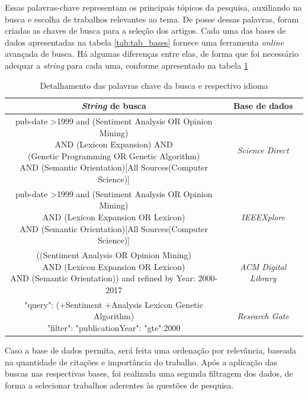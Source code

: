 \documentclass[12pt]{article}
\begin{document}
Essas palavras-chave representam os principais tópicos da pesquisa, auxiliando na busca e escolha de trabalhos relevantes ao tema. De posse dessas palavras, foram criadas as chaves de busca para a seleção dos artigos. Cada uma das bases de dados apresentadas na tabela \ref{tab:tab_bases} fornece uma ferramenta \emph{online} avançada de busca. Há algumas diferenças entre elas, de forma que foi necessário adequar a \emph{string} para cada uma, conforme apresentado na tabela \ref{tab:tab_palchaves}


\begin{table}[h]
\centering
\begin{tabular}{| c | c |}
\hline
\textbf{\emph{String} de busca} & \textbf{Base de dados} \\
\hline
\makecell{pub-date \textgreater 1999 and (Sentiment Analysis OR Opinion Mining)\\ AND (Lexicon Expansion) AND\\ (Genetic Programming OR Genetic Algorithm) \\ AND (Semantic Orientation)[All Sources(Computer Science)]} & \emph{Science Direct} \\
\hline
\makecell{pub-date \textgreater 1999 and (Sentiment Analysis OR Opinion Mining)\\ AND (Lexicon Expansion OR Lexicon) \\ AND (Semantic Orientation)[All Sources(Computer Science)]} & \emph{IEEEXplore} \\
\hline
\makecell{((Sentiment Analysis OR Opinion Mining)\\ AND (Lexicon Expansion OR Lexicon) \\ AND (Semantic Orientation))  and refined by Year: 2000-2017} & \emph{ACM Digital Library} \\
\hline
\makecell{"query": { (+Sentiment +Analysis Lexicon Genetic Algorithm) } \\ "filter": {"publicationYear":{ "gte":2000 }}} & \emph{Research Gate} \\
\hline
\end{tabular}
\caption{Detalhamento das palavras chave da busca e respectivo idioma}
\label{tab:tab_palchaves}
\end{table}

Caso a base de dados permita, será feita uma ordenação por relevância, baseada na quantidade de citações e importância do trabalho. Após a aplicação das buscas nas respectivas bases, foi realizada uma segunda filtragem dos dados, de forma a selecionar trabalhos aderentes às questões de pesquisa.
\end{document}
